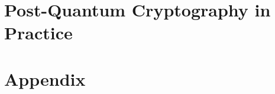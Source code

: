 \documentclass[11pt]{book}
\begin{document}
\part{Post-Quantum Cryptography in Practice}




\appendix
\part*{Appendix}
{}

\end{document}
